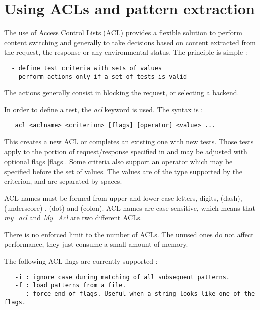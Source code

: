 
\chapter{Using ACLs and pattern extraction}

The use of Access Control Lists (ACL) provides a flexible solution to perform
content switching and generally to take decisions based on content extracted
from the request, the response or any environmental status. The principle is
simple :

\begin{verbatim}
  - define test criteria with sets of values
  - perform actions only if a set of tests is valid
\end{verbatim}


The actions generally consist in blocking the request, or selecting a backend.


In order to define a test, the \emph{acl} keyword is used. The syntax is :

\begin{verbatim}
   acl <aclname> <criterion> [flags] [operator] <value> ...
\end{verbatim}


This creates a new ACL  or completes an existing one with new tests.
Those tests apply to the portion of request/response specified in 
and may be adjusted with optional flags [flags]. Some criteria also support
an operator which may be specified before the set of values. The values are
of the type supported by the criterion, and are separated by spaces.


ACL names must be formed from upper and lower case letters, digits, \CHAR{-} (dash),
\CHAR{\_} (underscore) ,  (dot) and \CHAR{:} (colon). ACL names are case-sensitive,
which means that \emph{my\_acl} and \emph{My\_Acl} are two different ACLs.


There is no enforced limit to the number of ACLs. The unused ones do not affect
performance, they just consume a small amount of memory.


The following ACL flags are currently supported :

\begin{verbatim}
   -i : ignore case during matching of all subsequent patterns.
   -f : load patterns from a file.
   -- : force end of flags. Useful when a string looks like one of the flags.
\end{verbatim}


